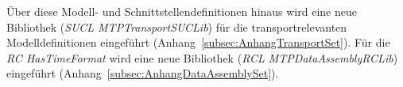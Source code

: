 Über diese Modell- und Schnittstellendefinitionen hinaus wird eine neue Bibliothek (\emph{SUCL MTPTransportSUCLib}) für die transportrelevanten Modelldefinitionen eingeführt (Anhang~\ref{subsec:AnhangTransportSet}). Für die \emph{RC HasTimeFormat} wird eine neue Bibliothek (\emph{RCL MTPDataAssemblyRCLib}) eingeführt (Anhang~\ref{subsec:AnhangDataAssemblySet}).


